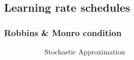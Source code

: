 \subsection{Learning rate schedules}

\begin{frame}\frametitle{Robbins \& Monro condition}

\begin{figure}[ht]
     \centering
     \begin{subfigure}[t]{0.45\textwidth}
         \svspace{-2cm}
         \centering
         \caption{Stochastic Approximation\\\cite{RobbinsMonro1951}}
         \usebox{\imagebox}%
     \end{subfigure}
     \hspace{13mm}
     \begin{subfigure}[t]{0.4\textwidth}
         \centering
     \end{subfigure}
\end{figure}

    
\end{frame}


